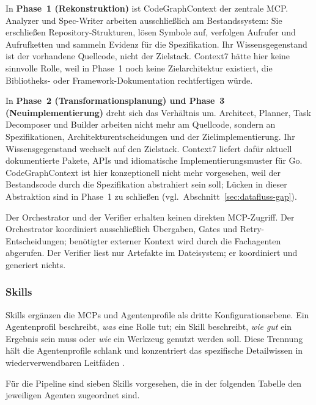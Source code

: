In \textbf{Phase~1 (Rekonstruktion)} ist CodeGraphContext der zentrale MCP. Analyzer und Spec-Writer arbeiten ausschließlich am Bestandssystem: Sie erschließen Repository-Strukturen, lösen Symbole auf, verfolgen Aufrufer und Aufrufketten und sammeln Evidenz für die Spezifikation. Ihr Wissensgegenstand ist der vorhandene Quellcode, nicht der Zielstack. Context7 hätte hier keine sinnvolle Rolle, weil in Phase~1 noch keine Zielarchitektur existiert, die Bibliotheks- oder Framework-Dokumentation rechtfertigen würde.

In \textbf{Phase~2 (Transformationsplanung) und Phase~3 (Neuimplementierung)} dreht sich das Verhältnis um. Architect, Planner, Task Decomposer und Builder arbeiten nicht mehr am Quellcode, sondern an Spezifikationen, Architekturentscheidungen und der Zielimplementierung. Ihr Wissensgegenstand wechselt auf den Zielstack. Context7 liefert dafür aktuell dokumentierte Pakete, APIs und idiomatische Implementierungsmuster für Go. CodeGraphContext ist hier konzeptionell nicht mehr vorgesehen, weil der Bestandscode durch die Spezifikation abstrahiert sein soll; Lücken in dieser Abstraktion sind in Phase~1 zu schließen (vgl.\ Abschnitt~\ref{sec:datafluss-gap}).

Der Orchestrator und der Verifier erhalten keinen direkten MCP-Zugriff. Der Orchestrator koordiniert ausschließlich Übergaben, Gates und Retry-Entscheidungen; benötigter externer Kontext wird durch die Fachagenten abgerufen. Der Verifier liest nur Artefakte im Dateisystem; er koordiniert und generiert nichts.

\subsubsection{Skills}

Skills ergänzen die MCPs und Agentenprofile als dritte Konfigurationsebene. Ein Agentenprofil beschreibt, \emph{was} eine Rolle tut; ein Skill beschreibt, \emph{wie gut} ein Ergebnis sein muss oder \emph{wie} ein Werkzeug genutzt werden soll. Diese Trennung hält die Agentenprofile schlank und konzentriert das spezifische Detailwissen in wiederverwendbaren Leitfäden \parencite{agentskillsspecification}.

Für die Pipeline sind sieben Skills vorgesehen, die in der folgenden Tabelle den jeweiligen Agenten zugeordnet sind.

